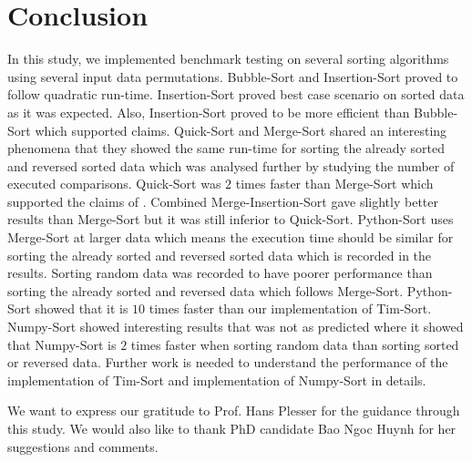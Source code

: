 \documentclass[sigconf, nonacm, natbib, screen, balance=False]{acmart}
\begin{document}
\section{Conclusion}\label{sec:conclusion}
In this study, we implemented benchmark testing on several sorting algorithms using several input data permutations. Bubble-Sort and Insertion-Sort proved to follow quadratic run-time. Insertion-Sort proved best case scenario on sorted data as it was expected. Also, Insertion-Sort proved to be more efficient than Bubble-Sort which supported \citet{astrachan} claims. \newline
Quick-Sort and Merge-Sort shared an interesting phenomena that they showed the same run-time for sorting the already sorted and reversed sorted data which was analysed further by studying the number of executed comparisons. Quick-Sort was $2$ times faster than Merge-Sort which supported the claims of \citet{skienna08}. Combined Merge-Insertion-Sort gave slightly better results than Merge-Sort but it was still inferior to Quick-Sort. \newline
Python-Sort uses Merge-Sort at larger data which means the execution time should be similar for sorting the already sorted and reversed sorted data which is recorded in the results. Sorting random data was recorded to have poorer performance than sorting the already sorted and reversed data which follows Merge-Sort. Python-Sort showed that it is $10$ times faster than our implementation of Tim-Sort. Numpy-Sort showed interesting results that was not as predicted where it showed that Numpy-Sort is $2$ times faster when sorting random data than sorting sorted or reversed data. Further work is needed to understand the performance of the \citet{cpythonsourcecode} implementation of Tim-Sort and \citet{harris2020array} implementation of Numpy-Sort in details.


\begin{acks}
We want to express our gratitude to Prof. Hans Plesser for the guidance through this study. We would also like to thank PhD candidate Bao Ngoc Huynh for her suggestions and comments.
\end{acks}




\end{document}
